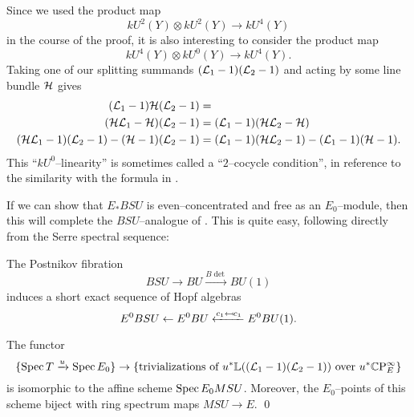 \begin{remark}\label{TwoCocycleConditionForBSUBundles}
Since we used the product map \[kU^2(Y) \otimes kU^2(Y) \to kU^4(Y)\] in the course of the proof, it is also interesting to consider the product map \[kU^4(Y) \otimes kU^0(Y) \to kU^4(Y).\]  Taking one of our splitting summands $(\mathcal{L}_1 - 1)(\mathcal{L}_2 - 1)$ and acting by some line bundle $\mathcal{H}$ gives
\begin{align*}
(\mathcal{L}_1-1)\mathcal{H}(\mathcal{L}_2 - 1) & = \\
(\mathcal{H} \mathcal{L}_1 - \mathcal{H})(\mathcal{L}_2 - 1) & = (\mathcal{L}_1-1)(\mathcal{H} \mathcal{L}_2 - \mathcal{H}) \\
(\mathcal{H} \mathcal{L}_1 - 1)(\mathcal{L}_2 - 1) - (\mathcal{H} - 1)(\mathcal{L}_2 - 1) & = (\mathcal{L}_1 - 1)(\mathcal{H} \mathcal{L}_2 - 1) - (\mathcal{L}_1 - 1)(\mathcal{H} - 1).
\end{align*}
This ``$kU^0$--linearity'' is sometimes called a ``$2$--cocycle condition'', in reference to the similarity with the formula in .
\end{remark}

If we can show that $E_* BSU$ is even--concentrated and free as an $E_0$--module, then this will complete the $BSU$--analogue of .  This is quite easy, following directly from the Serre spectral sequence:
\begin{lemma}\label{BSUtoBUtoCPinftyIsSexseq}
The Postnikov fibration \[BSU \to BU \xrightarrow{B\det} BU(1)\] induces a short exact sequence of Hopf algebras \[E^0 BSU \from E^0 BU \xleftarrow{c_1 \mapsfrom c_1} E^0 BU(1). \qed\]
\end{lemma}
\begin{corollary}\label{BSUTriumvirate}
The functor \[\{\operatorname{Spec} T \xrightarrow{u} \operatorname{Spec} E_0\} \to \left\{ \text{trivializations of $u^* \mathbb{L}((\mathcal{L}_1 - 1)(\mathcal{L}_2 - 1))$ over $u^* \mathbb{C}\mathrm P^\infty_E$} \right\}\] is isomorphic to the affine scheme $\operatorname{Spec} E_0 MSU$.  Moreover, the $E_0$--points of this scheme biject with ring spectrum maps $MSU \to E$. \qed
\end{corollary}

